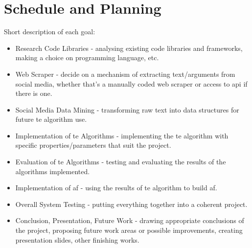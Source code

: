 \section{Schedule and Planning}
    
    
    Short description of each goal:
    \begin{itemize}
        \item Research Code Libraries - analysing existing code libraries and frameworks, making a choice on programming language, etc.
        \item Web Scraper - decide on a mechanism of extracting text/arguments from social media, whether that's a manually coded web scraper or access to \gls{api} if there is one.
        \item Social Media Data Mining - transforming raw text into data structures for future \gls{te} algorithm use.
        \item Implementation of \gls{te} Algorithms - implementing the \gls{te} algorithm with specific properties/parameters that suit the project.
        \item Evaluation of \gls{te} Algorithms - testing and evaluating the results of the algorithms implemented.
        \item Implementation of \gls{af} - using the results of \gls{te} algorithm to build \gls{af}.
        \item Overall System Testing - putting everything together into a coherent project.
        \item Conclusion, Presentation, Future Work - drawing appropriate conclusions of the project, proposing future work areas or possible improvements, creating presentation slides, other finishing works.
    \end{itemize}